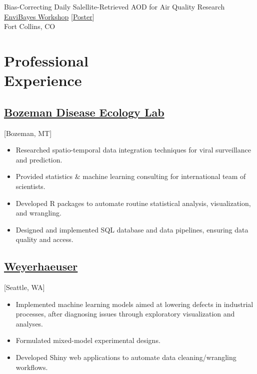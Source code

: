 \documentclass{wm_cv}
\begin{document}
\newpage

Bias-Correcting Daily Salellite-Retrieved AOD for Air Quality Research \hfill {}\\
\indent \quad \href{https://statistics.colostate.edu/envibayes-workshop/}{EnviBayes Workshop} [\href{https://www.wyattgmadden.com/files/posters/20230918envibayes/envibayes2023.pdf}{Poster}] \\ 
   \indent \quad Fort Collins, CO \\

\section{Professional \\ Experience}
\subsection{\href{http://bzndiseaselab.org/}{Bozeman Disease Ecology Lab}}[Bozeman, MT]
\begin{positions}
\end{positions}

\begin{itemize}
  \item Researched spatio-temporal data integration techniques for viral surveillance and prediction.
  \item Provided statistics \& machine learning consulting for international team of scientists.
  \item Developed R packages to automate routine statistical analysis, visualization, and wrangling.
  \item Designed and implemented SQL database and data pipelines, ensuring data quality and access.
\end{itemize}


\subsection{\href{https://en.wikipedia.org/wiki/Weyerhaeuser}{Weyerhaeuser}}[Seattle, WA]
\begin{positions}
\end{positions}

\begin{itemize}
  \item Implemented machine learning models aimed at lowering defects in industrial processes, after diagnosing issues through exploratory visualization and analyses.
  \item Formulated mixed-model experimental designs.
  \item Developed Shiny web applications to automate data cleaning/wrangling workflows.
\end{itemize} 
\end{document}
